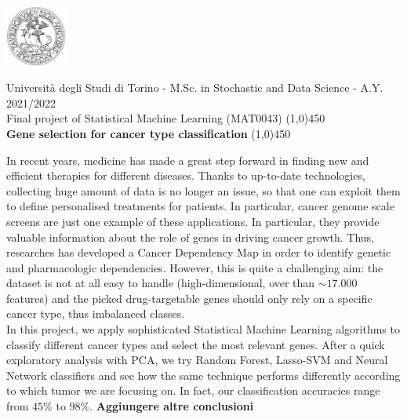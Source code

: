 \documentclass[a4paper,11pt, oneside]{article}  %
\begin{document}
\setcounter{secnumdepth}{2}
\pagestyle{plain} %

\centerline {\includegraphics[width=2cm]{logo.jpg}}
\begin{center}
Università degli Studi di Torino - M.Sc.  in Stochastic and Data Science - A.Y.  2021/2022 \\
\Large { Final project of Statistical Machine Learning (MAT0043)}
\line(1,0){450}\\ 
\vspace{0.4cm} 
{ \huge \textbf{Gene selection for cancer type classification} }
\vspace{0.1cm}
\line(1,0){450} \\
\end{center}

In recent years, medicine has made a great step forward in finding new and efficient therapies for different diseases. Thanks to up-to-date technologies, collecting huge amount of data is no longer an issue, so that one can exploit them to define personalised treatments for patients. In particular, cancer genome scale screens are just one example of these applications. In particular, they provide valuable information about the role of genes in driving cancer growth. Thus, researches has developed a Cancer Dependency Map in order to identify genetic and pharmacologic dependencies. However, this is quite a challenging aim: the dataset is not at all easy to handle (high-dimensional, over than $\sim 17.000$ features) and the picked drug-targetable genes should only rely on a specific cancer type, thus imbalanced classes. \\
In this project, we apply sophisticated Statistical Machine Learning algorithms to classify different cancer types and select the most relevant genes. After a quick exploratory analysis with PCA, we try Random Forest, Lasso-SVM and Neural Network classifiers and see how the same technique performs differently according to which tumor we are focusing on. In fact, our classification accuracies range from $45\%$ to $98\%$.  \textbf{Aggiungere altre conclusioni}
\medskip
\end{document}
